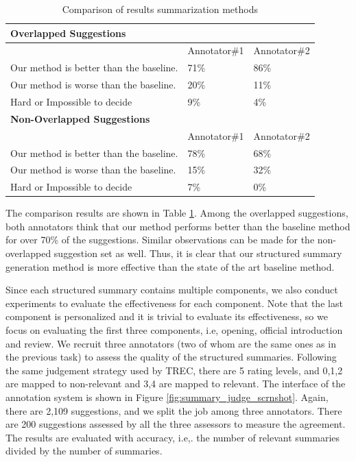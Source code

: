 \begin{table}[t]
\centering
\caption{Comparison of results summarization methods}
\label{table:comp_summary_anno_results}
\begin{tabular}
{ |l|l|l| }
\hline
\multicolumn{3}{|l|}{\textbf{Overlapped Suggestions}} \\
\hline
& Annotator\#1 & Annotator\#2 \\ \hline
Our method is better than the baseline. & 71\% & 86\% \\
Our method is worse than the baseline. & 20\% & 11\% \\
Hard or Impossible to decide & 9\% & 4\% \\
\hline
\hline
\multicolumn{3}{|l|}{\textbf{Non-Overlapped Suggestions}} \\
\hline
& Annotator\#1 & Annotator\#2 \\ \hline
Our method is better than the baseline. & 78\% & 68\% \\
Our method is worse than the baseline. & 15\% & 32\% \\
Hard or Impossible to decide & 7\% & 0\% \\
\hline
\end{tabular}
\end{table}


The comparison results are shown in Table \ref{table:comp_summary_anno_results}. 
Among the overlapped suggestions, both annotators think that our method performs 
better than the baseline method for over 70\% of the suggestions. 
Similar observations can be made for the non-overlapped
suggestion set as well. Thus, it is clear that our structured summary 
generation method is more effective than the state of the art baseline 
method. 


Since each structured summary contains multiple components, we 
also conduct experiments to evaluate the effectiveness for each 
component. Note that the last component is personalized and it is 
trivial to evaluate its effectiveness, so we focus on evaluating
the first three components, i.e, opening, official introduction and 
review. We recruit three annotators (two of whom are the same
ones as in the previous task) to assess the quality of 
the structured summaries. Following the same judgement strategy 
used by TREC, there are 5 rating levels, and 0,1,2 are mapped 
to non-relevant and 3,4 are mapped to relevant.  
The interface of the annotation system is 
shown in Figure \ref{fig:summary_judge_scrnshot}. 
Again, there are 2,109 suggestions, and we split the job 
among three annotators. There are 200 suggestions assessed
by all the three assessors to measure the agreement. 
The results are evaluated with accuracy, i.e,. the number
of relevant summaries divided by the number of summaries. 

